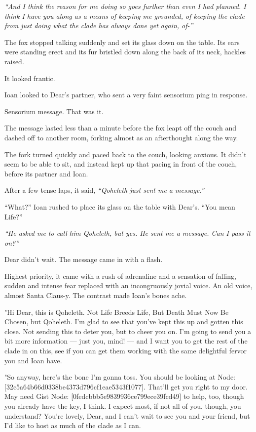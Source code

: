 \emph{``And I think the reason for me doing so goes further than even I had planned. I think I have you along as a means of keeping me grounded, of keeping the clade from just doing what the clade has always done yet again, of-''}

The fox stopped talking suddenly and set its glass down on the table. Its ears were standing erect and its fur bristled down along the back of its neck, hackles raised.

It looked frantic.

Ioan looked to Dear's partner, who sent a very faint sensorium ping in response.

Sensorium message. That was it.

The message lasted less than a minute before the fox leapt off the couch and dashed off to another room, forking almost as an afterthought along the way.

The fork turned quickly and paced back to the couch, looking anxious. It didn't seem to be able to sit, and instead kept up that pacing in front of the couch, before its partner and Ioan.

After a few tense laps, it said, \emph{``Qoheleth just sent me a message.''}

``What?'' Ioan rushed to place its glass on the table with Dear's. ``You mean Life?''

\emph{``He asked me to call him Qoheleth, but yes. He sent me a message. Can I pass it on?''}

Dear didn't wait. The message came in with a flash.

Highest priority, it came with a rush of adrenaline and a sensation of falling, sudden and intense fear replaced with an incongruously jovial voice. An old voice, almost Santa Claus-y. The contrast made Ioan's bones ache.

"Hi Dear, this is Qoheleth. Not Life Breeds Life, But Death Must Now Be Chosen, but Qoheleth. I'm glad to see that you've kept this up and gotten this close. Not sending this to deter you, but to cheer you on. I'm going to send you a bit more information --- just you, mind! --- and I want you to get the rest of the clade in on this, see if you can get them working with the same delightful fervor you and Ioan have.

"So anyway, here's the bone I'm gonna toss. You should be looking at Node: {[}32c5a64b66d0338be4373d796cf1eae5343f1077{]}. That'll get you right to my door. May need Gist Node: {[}0fedcbbb5e9839936ce799ece39fcd49{]} to help, too, though you already have the key, I think. I expect most, if not all of you, though, you understand? You're lovely, Dear, and I can't wait to see you and your friend, but I'd like to host as much of the clade as I can.


